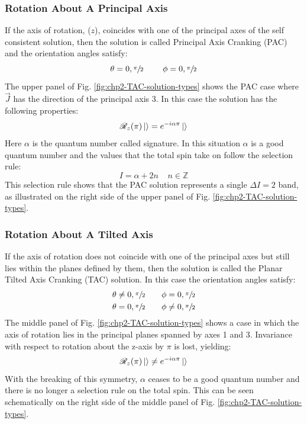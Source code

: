 \subsubsection{Rotation About A Principal Axis}
\label{sssec:models-tac-pac}
If the axis of rotation, ($z$), coincides with one of the principal axes of the self consistent solution, then the solution is called Principal Axis Cranking (PAC) and the orientation angles satisfy:
\begin{equation}
\label{eqn:chp2-PAC-angle-conditions}
\theta = 0, \sfrac{\pi}{2}~~~~~~~ \phi= 0, \sfrac{\pi}{2}
\end{equation}
The upper panel of Fig. \ref{fig:chp2-TAC-solution-types} shows the PAC case where $\vec{J}$ has the direction of the principal axis 3. In this case the solution has the following properties:
\begin{equation}
\label{eqn:chp2=TAC-PAC-sol-prop}
\mathscr{R}_z(\pi)\Ket{}=e^{-i\alpha\pi}\Ket{}
\end{equation}
Here $\alpha$ is the quantum number called signature. In this situation $\alpha$ is a good quantum number and the values that the total spin take on follow the selection rule:
\begin{equation}
\label{eqn:chp2=TAC-PAC-spin-sel-rule}
I=\alpha+2n ~~~~~n\in{}\mathds{Z}
\end{equation}
This selection rule shows that the PAC solution represents a single $\Delta{}I=2$ band, as illustrated on the right side of the upper panel of Fig. \ref{fig:chp2-TAC-solution-types}.

\subsubsection{Rotation About A Tilted Axis}
\label{sssec:models-tac-tac}
If the axis of rotation does not coincide with one of the principal axes but still lies within the planes defined by them, then the solution is called the Planar Tilted Axis Cranking (TAC) solution. In this case the orientation angles satisfy:
\begin{align}
\theta &\neq{} 0, \sfrac{\pi}{2} ~~~~~~ \phi=0, \sfrac{\pi}{2}\\
\theta &= 0, \sfrac{\pi}{2} ~~~~~~ \phi\neq{}0, \sfrac{\pi}{2}
\end{align}
The middle panel of Fig. \ref{fig:chp2-TAC-solution-types} shows a case in which the axis of rotation lies in the principal planes spanned by axes 1 and 3. Invariance with respect to rotation about the z-axis by $\pi$ is lost, yielding:
\begin{equation}
\label{eqn:chp2=TAC-TAC-sol-prop}
\mathscr{R}_z(\pi)\Ket{}\neq{}e^{-i\alpha\pi}\Ket{}
\end{equation}
With the breaking of this symmetry, $\alpha$ ceases to be a good quantum number and there is no longer a selection rule on the total spin. This can be seen schematically on the right side of the middle panel of Fig. \ref{fig:chp2-TAC-solution-types}.

